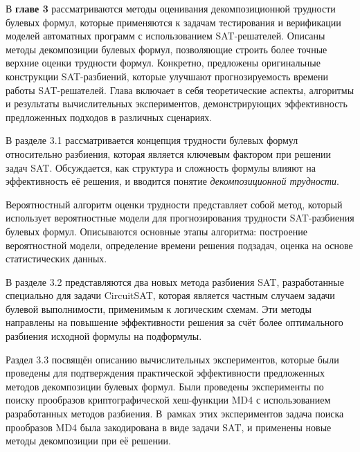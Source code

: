 В \textbf{главе 3} рассматриваются методы оценивания декомпозиционной трудности булевых формул, которые применяются к задачам тестирования и верификации моделей автоматных программ с использованием SAT-решателей.
Описаны методы декомпозиции булевых формул, позволяющие строить более точные верхние оценки трудности формул.
Конкретно, предложены оригинальные конструкции SAT-разбиений, которые улучшают прогнозируемость времени работы SAT-решателей.
Глава включает в себя теоретические аспекты, алгоритмы и результаты вычислительных экспериментов, демонстрирующих эффективность предложенных подходов в различных сценариях.

В разделе 3.1 рассматривается концепция трудности булевых формул относительно разбиения, которая является ключевым фактором при решении задач SAT.
Обсуждается, как структура и сложность формулы влияют на эффективность её решения, и вводится понятие \textit{декомпозиционной трудности}.

Вероятностный алгоритм оценки трудности представляет собой метод, который использует вероятностные модели для прогнозирования трудности SAT-разбиения булевых формул. Описываются основные этапы алгоритма: построение вероятностной модели, определение времени решения подзадач, оценка на основе статистических данных.

В разделе 3.2 представляются два новых метода разбиения SAT, разработанные специально для задачи CircuitSAT, которая является частным случаем задачи булевой выполнимости, применимым к логическим схемам.
Эти методы направлены на повышение эффективности решения за счёт более оптимального разбиения исходной формулы на подформулы.


Раздел 3.3 посвящён описанию вычислительных экспериментов, которые были проведены для подтверждения практической эффективности предложенных методов декомпозиции булевых формул.
Были проведены эксперименты по поиску прообразов криптографической хеш-функции MD4 с использованием разработанных методов разбиения.
В~рамках этих экспериментов задача поиска прообразов MD4 была закодирована в виде задачи SAT, и применены новые методы декомпозиции при её решении.


